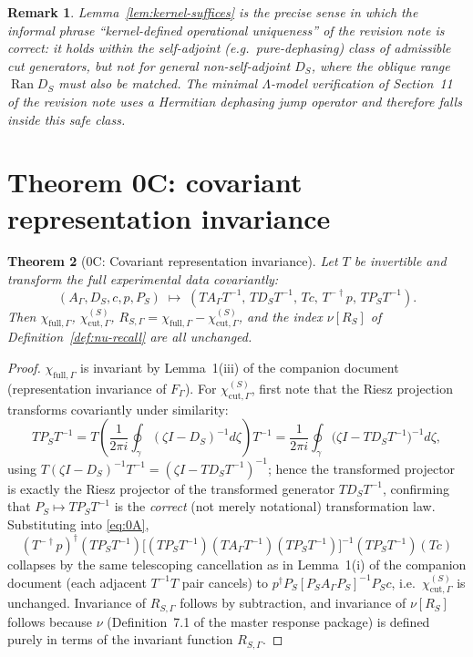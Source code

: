 \documentclass[11pt]{article}
\newtheorem{theorem}{Theorem}[section]
\newtheorem{remark}[theorem]{Remark}
\newcommand{\Ran}{\operatorname{Ran}}
\begin{document}
\begin{remark}
Lemma~\ref{lem:kernel-suffices} is the precise sense in which the
informal phrase ``kernel-defined operational uniqueness'' of the revision
note is correct: it holds within the self-adjoint (e.g.\ pure-dephasing)
class of admissible cut generators, but not for general non-self-adjoint
$D_S$, where the oblique range $\Ran D_S$ must also be matched. The
minimal $\Lambda$-model verification of Section~11 of the revision note
uses a Hermitian dephasing jump operator and therefore falls inside this
safe class.
\end{remark}

\section{Theorem 0C: covariant representation invariance}

\begin{theorem}[0C: Covariant representation invariance]
\label{thm:0C}
Let $T$ be invertible and transform the full experimental data covariantly:
\[
(A_\Gamma,D_S,c,p,P_S)
\;\longmapsto\;
(TA_\Gamma T^{-1},\,TD_ST^{-1},\,Tc,\,T^{-\dagger}p,\,TP_ST^{-1}).
\]
Then $\chi_{\mathrm{full},\Gamma}$, $\chi_{\mathrm{cut},\Gamma}^{(S)}$,
$R_{S,\Gamma}=\chi_{\mathrm{full},\Gamma}-\chi_{\mathrm{cut},\Gamma}^{(S)}$,
and the index $\nu[R_S]$ of Definition~\ref{def:nu-recall} are all
unchanged.
\end{theorem}

\begin{proof}
$\chi_{\mathrm{full},\Gamma}$ is invariant by Lemma~1(iii) of the
companion document (representation invariance of $F_\Gamma$). For
$\chi_{\mathrm{cut},\Gamma}^{(S)}$, first note that the Riesz projection
transforms covariantly under similarity:
\[
TP_ST^{-1}
=T\left(\frac1{2\pi i}\oint_\gamma(\zeta I-D_S)^{-1}d\zeta\right)T^{-1}
=\frac1{2\pi i}\oint_\gamma\bigl(\zeta I-TD_ST^{-1}\bigr)^{-1}d\zeta,
\]
using $T(\zeta I-D_S)^{-1}T^{-1}=(\zeta I-TD_ST^{-1})^{-1}$; hence the
transformed projector is exactly the Riesz projector of the transformed
generator $TD_ST^{-1}$, confirming that $P_S\mapsto TP_ST^{-1}$ is the
\emph{correct} (not merely notational) transformation law. Substituting
into \eqref{eq:0A},
\[
(T^{-\dagger}p)^\dagger(TP_ST^{-1})\bigl[(TP_ST^{-1})(TA_\Gamma T^{-1})(TP_ST^{-1})\bigr]^{-1}(TP_ST^{-1})(Tc)
\]
collapses by the same telescoping cancellation as in Lemma~1(i) of the
companion document (each adjacent $T^{-1}T$ pair cancels) to
$p^\dagger P_S[P_SA_\Gamma P_S]^{-1}P_Sc$, i.e.\ $\chi_{\mathrm{cut},\Gamma}^{(S)}$
is unchanged. Invariance of $R_{S,\Gamma}$ follows by subtraction, and
invariance of $\nu[R_S]$ follows because $\nu$ (Definition~7.1 of the
master response package) is defined purely in terms of the invariant
function $R_{S,\Gamma}$.
\end{proof}
\end{document}
